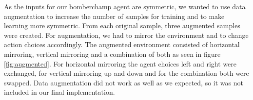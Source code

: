 \newline
\newline
\newline
\newline
As the inputs for our bomberchamp agent are symmetric, we wanted to use data augmentation to increase the number of samples for training and to make learning more symmetric.
From each original sample, three augmented samples were created. For augmentation, we had to mirror the environment and to change action choices accordingly. The augmented environment consisted of horizontal mirroring, vertical mirroring and a combination of both as seen in figure \ref{fig:augmented}.
For horizontal mirroring the agent choices left and right were exchanged, for vertical mirroring up and down and for the combination both were swapped. \newline
Data augmentation did not work as well as we expected, so it was not included in our final implementation.